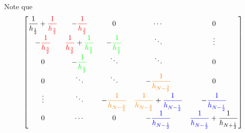 \begin{frame}
	Note que
	\begin{align*}
		\begin{bmatrix}
			\dfrac{1}{h_{\frac{1}{2}}}+\mathcolor{red}{\mathcolor{red}{\dfrac{1}{h_{\frac{3}{2}}}}} & -\mathcolor{red}{\dfrac{1}{h_{\frac{3}{2}}}}                                              & 0                                                 & \cdots                                                                                          & 0                                                                           \\
			-\mathcolor{red}{\dfrac{1}{h_{\frac{3}{2}}}}                                            & \mathcolor{red}{\dfrac{1}{h_{\frac{3}{2}}}}+\mathcolor{green}{\dfrac{1}{h_{\frac{5}{2}}}} & -\mathcolor{green}{\dfrac{1}{h_{\frac{5}{2}}}}    & \ddots                                                                                          & \vdots                                                                      \\
			0                                                                                       & -\mathcolor{green}{\dfrac{1}{h_{\frac{5}{2}}}}                                            & \ddots                                            & \ddots                                                                                          & 0                                                                           \\
			0                                                                                       & \ddots                                                                                    & \ddots                                            & -\mathcolor{orange}{\dfrac{1}{h_{N-\frac{3}{2}}}}                                               & 0                                                                           \\
			\vdots                                                                                  & \ddots                                                                                    & -\mathcolor{orange}{\dfrac{1}{h_{N-\frac{3}{2}}}} & \mathcolor{orange}{\dfrac{1}{h_{N-\frac{3}{2}}}}+\mathcolor{blue}{\dfrac{1}{h_{N-\frac{1}{2}}}} & -\mathcolor{blue}{\dfrac{1}{h_{N-\frac{1}{2}}}}                             \\
			0                                                                                       & \cdots                                                                                    & 0                                                 & -\mathcolor{blue}{\dfrac{1}{h_{N-\frac{1}{2}}}}                                                 & \mathcolor{blue}{\dfrac{1}{h_{N-\frac{1}{2}}}}+\dfrac{1}{h_{N+\frac{1}{2}}}

\end{bmatrix}
\end{align*}
\end{frame}
